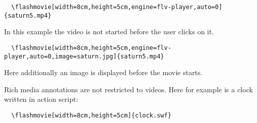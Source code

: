 \documentclass[10pt]{article}
\begin{document}
\begin{verbatim}
  \flashmovie[width=8cm,height=5cm,engine=flv-player,auto=0]{saturn5.mp4}
\end{verbatim}
In this example the video is not started before the user clicks on it.

\vspace{1cm}

\begin{verbatim}
  \flashmovie[width=8cm,height=5cm,engine=flv-player,auto=0,image=saturn.jpg]{saturn5.mp4}
\end{verbatim}
Here additionally an image is displayed before the movie starts.

\newpage

Rich media annotations are not restricted to videos.
Here for example is a clock written in action script:

\begin{verbatim}
  \flashmovie[width=8cm,height=5cm]{clock.swf}
\end{verbatim}
\end{document}
